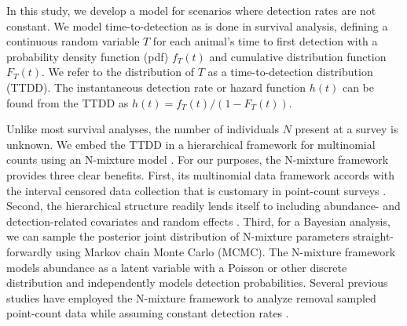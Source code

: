 \documentclass[useAMS,usenatbib,referee,12pt]{article}
\begin{document}
In this study, we develop a model for scenarios where detection rates are not constant.  
We model time-to-detection as is done in survival analysis, defining a continuous random variable $T$ for each animal's time to first detection with a probability density function (pdf) $f_T(t)$ and cumulative distribution function $F_T(t)$.  
We refer to the distribution of $T$ as a time-to-detection distribution (TTDD).  
The instantaneous detection rate or hazard function $h(t)$ can be found from the TTDD as $h(t) = f_T(t) / (1-F_T(t))$.

Unlike most survival analyses, the number of individuals $N$ present at a survey is unknown.  
We embed the TTDD in a hierarchical framework for multinomial counts using an N-mixture model \citep{Wyatt2002, Royle2004NMixture}.  
For our purposes, the N-mixture framework provides three clear benefits.  
First, its multinomial data framework accords with the interval censored data collection that is customary in point-count surveys \citep{Ralph1995}.  
Second, the hierarchical structure readily lends itself to including abundance- and detection-related covariates and random effects \citep{Dorazio2005, Etterson2009, Amundson2014}.  
Third, for a Bayesian analysis, we can sample the posterior joint distribution of N-mixture parameters straight-forwardly using Markov chain Monte Carlo (MCMC).  
The N-mixture framework models abundance as a latent variable with a Poisson or other discrete distribution and independently models detection probabilities.  
Several previous studies have employed the N-mixture framework to analyze removal sampled point-count data while assuming constant detection rates \citep{Royle2004Generalized, Dorazio2005, Etterson2009, Solymos2013, Amundson2014}.  



\end{document}
